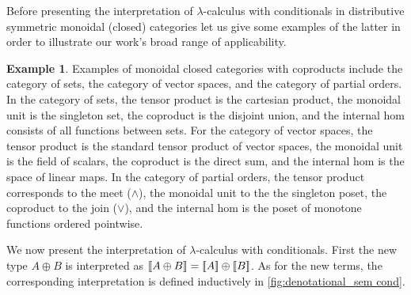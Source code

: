 \documentclass[10pt,a4paper]{amsart}
\theoremstyle{definition}
\theoremstyle{definition}
\newtheorem{example}[definition]{Example}
\theoremstyle{definition}
\theoremstyle{definition}
\theoremstyle{definition}
\theoremstyle{definition}
\begin{document}

Before presenting the interpretation of $\lambda$-calculus with conditionals in
distributive symmetric monoidal (closed) categories let us give some examples
of the latter in order to illustrate our work's broad range of applicability.

\begin{example}
Examples of monoidal closed categories with coproducts include the category of sets, the category of vector spaces, and the category of partial orders. In the category of sets, the tensor product is the cartesian product, the monoidal unit is the singleton set, the coproduct is the disjoint union, and the internal hom consists of all functions between sets. For the category of vector spaces, the tensor product is the standard tensor product of vector spaces, the monoidal unit is the field of scalars, the coproduct is the direct sum, and the internal hom is the space of linear maps. In the category of partial orders, the tensor product corresponds to the meet ($\wedge$), the monoidal unit to the the singleton poset, the coproduct to the join ($\vee$), and the internal hom is the poset of monotone functions ordered pointwise.
\end{example}

We now present the interpretation of $\lambda$-calculus with conditionals.
First the new type $A \oplus B$ is interpreted as $\left \llbracket A \oplus B \right \rrbracket = [\![A
]\!] \oplus [\![ B ]\!]$. As for the new terms, the corresponding
interpretation is defined inductively in \autoref{fig:denotational_sem cond}.
\end{document}
